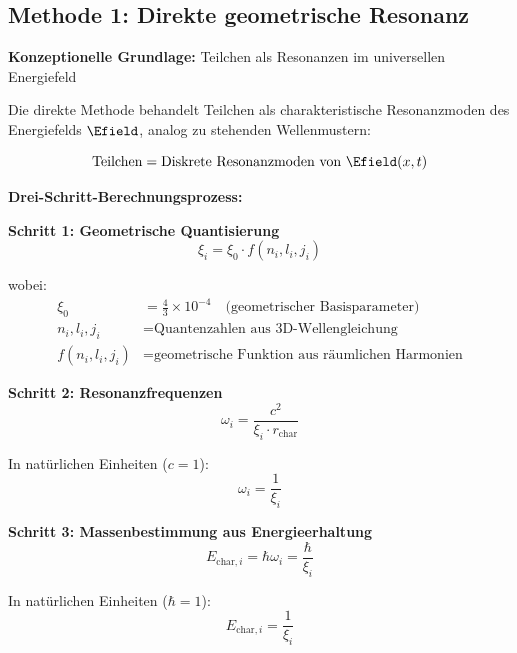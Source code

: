 	\subsection{Methode 1: Direkte geometrische Resonanz}
	\label{subsec:direct_geometric_method}
	
	\textbf{Konzeptionelle Grundlage:} Teilchen als Resonanzen im universellen Energiefeld
	
	Die direkte Methode behandelt Teilchen als charakteristische Resonanzmoden des Energiefelds $\Efield$, analog zu stehenden Wellenmustern:
	
	\begin{equation}
		\text{Teilchen} = \text{Diskrete Resonanzmoden von } \Efield(x,t)
	\end{equation}
	
	\textbf{Drei-Schritt-Berechnungsprozess:}
	
	\textbf{Schritt 1: Geometrische Quantisierung}
	\begin{equation}
		\xi_i = \xi_0 \cdot f(n_i, l_i, j_i)
		\label{eq:geometric_quantization}
	\end{equation}
	
	wobei:
	\begin{align}
		\xi_0 &= \frac{4}{3} \times 10^{-4} \quad \text{(geometrischer Basisparameter)} \\
		n_i, l_i, j_i &= \text{Quantenzahlen aus 3D-Wellengleichung} \\
		f(n_i, l_i, j_i) &= \text{geometrische Funktion aus räumlichen Harmonien}
	\end{align}
	
	\textbf{Schritt 2: Resonanzfrequenzen}
	\begin{equation}
		\omega_i = \frac{c^2}{\xi_i \cdot r_{\text{char}}}
		\label{eq:resonance_frequencies}
	\end{equation}
	
	In natürlichen Einheiten ($c = 1$):
	\begin{equation}
		\omega_i = \frac{1}{\xi_i}
	\end{equation}
	
	\textbf{Schritt 3: Massenbestimmung aus Energieerhaltung}
	\begin{equation}
		E_{\text{char},i} = \hbar \omega_i = \frac{\hbar}{\xi_i}
		\label{eq:energy_from_frequency}
	\end{equation}
	
	In natürlichen Einheiten ($\hbar = 1$):
	\begin{equation}
		\boxed{E_{\text{char},i} = \frac{1}{\xi_i}}
		\label{eq:characteristic_energy_direct}
	\end{equation}
	

